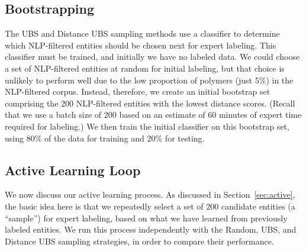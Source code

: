\subsection{Bootstrapping}\label{sec:bootstrap}
The UBS and Distance UBS sampling methods use a classifier to 
determine which NLP-filtered entities should be chosen next for expert labeling.
This classifier must be trained, and initially we have no labeled data.
We could choose a set of NLP-filtered entities at random for initial labeling, 
but that choice is unlikely to perform well due to the low proportion of polymers (just 5\%) in the NLP-filtered corpus.
Instead, therefore, we create an initial bootstrap set comprising the 200 NLP-filtered entities 
with the lowest distance scores.
(Recall that we use a batch size of 200 based on an estimate of 60 minutes of expert time required for labeling.)
We then train the initial classifier on this bootstrap set, using 80\% of the data for training and 20\% for testing.

\subsection{Active Learning Loop}
We now discuss our active learning process. 
As discussed in Section~\ref{sec:active}, the basic idea here is that we repeatedly select a set of 200
candidate entities (a ``sample'') for expert labeling, 
based on what we have learned from previously labeled entities.
We run this process independently with the Random, UBS, and Distance UBS sampling strategies,
in order to compare their performance.

